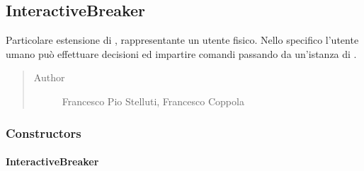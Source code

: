 \documentclass[letterpaper,10pt,italian,openany,oneside]{sphinxmanual}
\begin{document}
\subsection{InteractiveBreaker}
\label{\detokenize{test/it/unicam/cs/pa/mastermind/players/InteractiveBreaker:interactivebreaker}}\label{\detokenize{test/it/unicam/cs/pa/mastermind/players/InteractiveBreaker::doc}}

\begin{fulllineitems}
\label{\detokenize{test/it/unicam/cs/pa/mastermind/players/InteractiveBreaker:it.unicam.cs.pa.mastermind.players.InteractiveBreaker}}
Particolare estensione di , rappresentante un utente fisico. Nello specifico l’utente umano può effettuare decisioni ed impartire comandi passando da un’istanza di .
\begin{quote}\begin{description}
\item[{Author}] \leavevmode
Francesco Pio Stelluti, Francesco Coppola

\end{description}\end{quote}

\end{fulllineitems}



\subsubsection{Constructors}
\label{\detokenize{test/it/unicam/cs/pa/mastermind/players/InteractiveBreaker:constructors}}

\paragraph{InteractiveBreaker}
\label{\detokenize{test/it/unicam/cs/pa/mastermind/players/InteractiveBreaker:id1}}

\begin{fulllineitems}
\label{\detokenize{test/it/unicam/cs/pa/mastermind/players/InteractiveBreaker:it.unicam.cs.pa.mastermind.players.InteractiveBreaker.InteractiveBreaker(GameView, int)}}
\end{fulllineitems}
\end{document}

